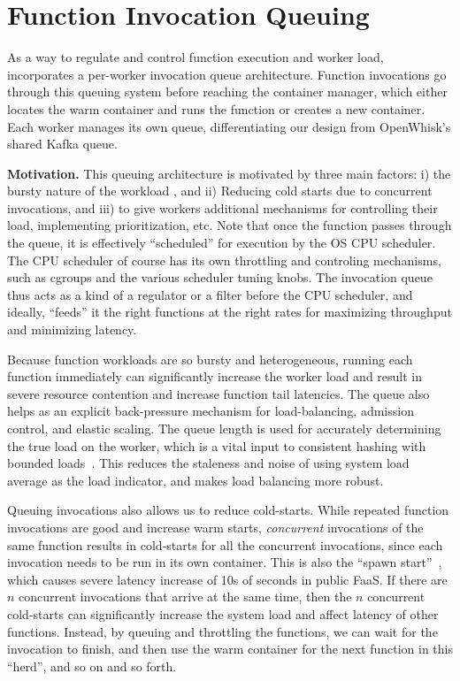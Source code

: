 \section{Function Invocation Queuing}
\label{sec:q}

As a way to regulate and control function execution and worker load, \sysname~ incorporates a per-worker invocation queue architecture. 
Function invocations go through this queuing system before reaching the container manager, which either locates the warm container and runs the function or creates a new container.
Each worker manages its own queue, differentiating our design from OpenWhisk's shared Kafka queue. 

\noindent \textbf{Motivation.}
%
This queuing architecture is motivated by three main factors: i) the bursty nature of the workload , and ii) Reducing cold starts due to concurrent invocations, and iii) to give workers additional mechanisms for controlling their load, implementing prioritization, etc. 
Note that once the function passes through the queue, it is effectively ``scheduled'' for execution by the OS CPU scheduler.
The CPU scheduler of course has its own throttling and controling mechanisms, such as cgroups and the various scheduler tuning knobs.
The invocation queue thus acts as a kind of a regulator or a filter before the CPU scheduler, and ideally, ``feeds'' it the right functions at the right rates for maximizing throughput and minimizing latency.
%

Because function workloads are so bursty and heterogeneous, running each function immediately can significantly increase the worker load and result in severe resource contention and increase  function tail latencies.
%
The queue also helps as an explicit back-pressure mechanism for load-balancing, admission control, and elastic scaling.
The queue length is  used for accurately determining the true load on the worker, which is a vital input to consistent hashing with bounded loads~\cite{faaslb-hpdc22}.
This reduces the staleness and noise of using system load average as the load indicator, and makes load balancing more robust.


Queuing invocations also allows us to reduce cold-starts.
While repeated function invocations are good and increase warm starts, 
\emph{concurrent} invocations of the same function results in cold-starts for all the concurrent invocations, since each invocation needs to be run in its own container.
This is also the ``spawn start''~\cite{ristov_colder_warmer}, which causes severe latency increase of 10s of  seconds in public FaaS. 
If there are $n$ concurrent invocations that arrive at the same time, then the $n$ concurrent cold-starts can significantly increase the system load and affect latency of other functions.
Instead, by queuing and throttling the functions, we can wait for the invocation to finish, and then use the warm container for the next function in this ``herd'', and so on and so forth. %

